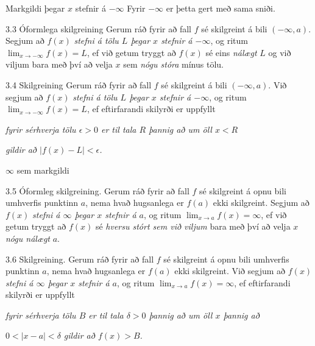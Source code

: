 \documentclass[icelandic,a4paper,12pt]{article}
\begin{document}
\begin{frame}{Markgildi þegar $x$ stefnir á $-\infty$}
Fyrir $-\infty$ er þetta gert með sama sniði.

  \begin{block}{3.3 Óformlega skilgreining}
 Gerum ráð fyrir að fall $f$ sé
skilgreint á bili $(-\infty, a)$.  Segjum að  $f(x)$
{\it stefni á tölu $L$ þegar $x$ stefnir á $-\infty$}, og ritum
$\lim_{x\rightarrow -\infty} f(x)=L$, ef við getum tryggt að  $f(x)$ sé eins
{\em nálægt}
$L$ og við viljum bara með því að velja $x$ sem {\em nógu stóra} 
mínus tölu.
 \end{block}

 \pause
 
\begin{block}{3.4 Skilgreining}
Gerum ráð fyrir að fall $f$ sé
skilgreint á bili $(-\infty,a)$.  Við segjum að $f(x)$
{\it stefni á tölu $L$ þegar $x$ stefnir á $-\infty$}, og ritum
$\lim_{x\rightarrow -\infty} f(x)=L$, ef eftirfarandi skilyrði er uppfyllt

{\it fyrir sérhverja tölu $\epsilon>0$ er til tala $R$ þannig
  að um öll $x<R$ } 

{\em gildir að  $|f(x)-L|<\epsilon$.} 
\end{block}

\end{frame}

\begin{frame}{$\infty$ sem markgildi}
 \begin{block}{3.5 Óformleg skilgreining.}  Gerum ráð fyrir að fall $f$ sé
skilgreint á opnu bili umhverfis punktinn $a$, nema hvað hugsanlega er
$f(a)$ ekki skilgreint.  Segjum að  $f(x)$
{\it stefni á $\infty$ þegar $x$ stefnir á $a$}, og ritum
$\lim_{x\rightarrow a} f(x)=\infty$, ef við getum tryggt að  $f(x)$ sé {\em
  hversu stórt sem við viljum}
 bara með því að velja $x$ {\em nógu nálægt} $a$.  

 \end{block}
\pause
\begin{block}{3.6  Skilgreining.}
 Gerum ráð fyrir að fall $f$ sé
skilgreint á opnu bili umhverfis punktinn $a$, nema hvað hugsanlega er
$f(a)$ ekki skilgreint.  Við segjum að $f(x)$
{\it stefni á $\infty$ þegar $x$ stefnir á $a$}, og ritum
$\lim_{x\rightarrow a} f(x)=\infty$, ef eftirfarandi skilyrði er uppfyllt

{\it fyrir sérhverja tölu $B$ er til tala $\delta>0$ þannig
  að um öll $x$ þannig að} 

{\em $0<|x-a|<\delta$ 
gildir að  $f(x)>B$.}
\end{block}

\end{frame}
\end{document}

